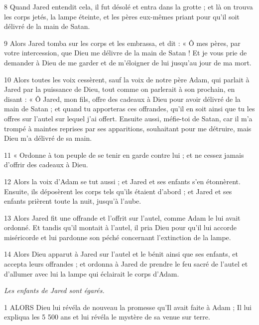 \par 8 Quand Jared entendit cela, il fut désolé et entra dans la grotte ; et là on trouva les corps jetés, la lampe éteinte, et les pères eux-mêmes priant pour qu'il soit délivré de la main de Satan.

\par 9 Alors Jared tomba sur les corps et les embrassa, et dit : « Ô mes pères, par votre intercession, que Dieu me délivre de la main de Satan ! Et je vous prie de demander à Dieu de me garder et de m'éloigner de lui jusqu'au jour de ma mort.

\par 10 Alors toutes les voix cessèrent, sauf la voix de notre père Adam, qui parlait à Jared par la puissance de Dieu, tout comme on parlerait à son prochain, en disant : « Ô Jared, mon fils, offre des cadeaux à Dieu pour avoir délivré de la main de Satan ; et quand tu apporteras ces offrandes, qu'il en soit ainsi que tu les offres sur l'autel sur lequel j'ai offert. Ensuite aussi, méfie-toi de Satan, car il m'a trompé à maintes reprises par ses apparitions, souhaitant pour me détruire, mais Dieu m'a délivré de sa main.

\par 11 « Ordonne à ton peuple de se tenir en garde contre lui ; et ne cessez jamais d’offrir des cadeaux à Dieu.

\par 12 Alors la voix d'Adam se tut aussi ; et Jared et ses enfants s'en étonnèrent. Ensuite, ils déposèrent les corps tels qu'ils étaient d'abord ; et Jared et ses enfants prièrent toute la nuit, jusqu'à l'aube.

\par 13 Alors Jared fit une offrande et l'offrit sur l'autel, comme Adam le lui avait ordonné. Et tandis qu'il montait à l'autel, il pria Dieu pour qu'il lui accorde miséricorde et lui pardonne son péché concernant l'extinction de la lampe.

\par 14 Alors Dieu apparut à Jared sur l'autel et le bénit ainsi que ses enfants, et accepta leurs offrandes ; et ordonna à Jared de prendre le feu sacré de l'autel et d'allumer avec lui la lampe qui éclairait le corps d'Adam.


\par \textit{Les enfants de Jared sont égarés.}

\par 1 ALORS Dieu lui révéla de nouveau la promesse qu'Il avait faite à Adam ; Il lui expliqua les 5 500 ans et lui révéla le mystère de sa venue sur terre.

